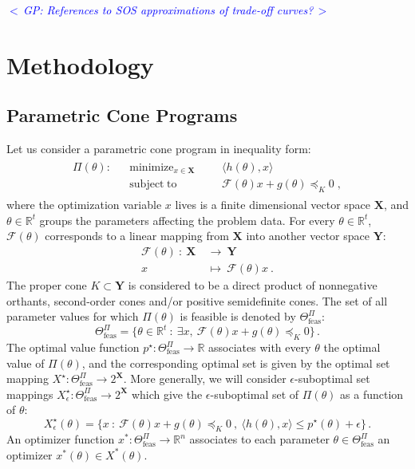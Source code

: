 \documentclass{article}
\newcommand{\R}{\mathbb{R}}        %
\newcommand{\ppar}{\theta}                  %
\newcommand{\X}{\mathbf{X}}
\newcommand{\Y}{\mathbf{Y}}
\newcommand{\calF}{\mathcal{F}}
\newcommand{\Pfeas}{\Theta_{\text{feas}}^\Pi}
\DeclareMathOperator*{\minimize}{minimize}
\DeclareMathOperator*{\subj}{subject\;to}
\newcommand{\commentGP}[1]{\noindent \textcolor{blue}{\emph{$<\,$GP: #1$\,>$}}}%
\begin{document}
\commentGP{References to SOS approximations of trade-off curves?}



\section{Methodology}\label{sec:methodology}


\subsection{Parametric Cone Programs}\label{subsec:parametric_program}

Let us consider a parametric cone program in inequality form:
\begin{gather}\label{eq:parametric_primal}
\begin{aligned}
\Pi(\ppar): && \minimize_{x\in\X} &&& \langle h(\ppar), x \rangle\\
            && \subj              &&& \calF(\ppar)x +g(\ppar)\preceq_K 0 \;,%
\end{aligned}
\end{gather}
where the optimization variable $x$ lives is a finite dimensional vector space $\X$, and $\ppar\in\R^t$ groups the parameters affecting the problem data. For every $\ppar\in\R^t$, $\calF(\ppar)$ corresponds to a linear mapping from $\X$ into another vector space $\Y$:
\begin{align*}
\calF(\ppar) ~:~ \X~ &\rightarrow~ \Y \\
                  x~ &\mapsto~ \calF(\ppar)x ~.
\end{align*}
The proper cone $K\subset\Y$ is considered to be a direct product of nonnegative orthants, second-order cones and/or positive semidefinite cones. The set of all parameter values for which $\Pi(\ppar)$ is feasible is denoted by $\Pfeas$:
\[ \Pfeas = \{\ppar\in\R^t ~:~ \exists x ,~ \calF(\ppar)x+g(\ppar)\preceq_K 0 \}\,.%
\]
The optimal value function $p^\star:\Pfeas\rightarrow\R$ associates with every $\ppar$ the optimal value of $\Pi(\ppar)$, and the corresponding optimal set is given by the optimal set mapping $X^\star:\Pfeas\rightarrow 2^{\X}$. More generally, we will consider $\epsilon$-suboptimal set mappings $X_\epsilon^\star:\Pfeas\rightarrow 2^{\X}$ which give the $\epsilon$-suboptimal set of $\Pi(\ppar)$ as a function of $\ppar$:
\[ X^\star_\epsilon(\ppar) = \{x ~:~ \calF(\ppar)x+g(\ppar)\preceq_K 0 ~,~ \langle h(\ppar), x \rangle \leq p^\star(\ppar)+\epsilon\} \,.%
\]
An optimizer function $x^*:\Pfeas\rightarrow\R^n$ associates to each parameter $\ppar\in\Pfeas$ an optimizer $x^*(\ppar)\in X^*(\ppar)$.
\end{document}

